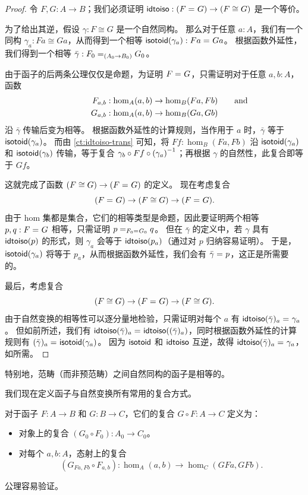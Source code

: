 \begin{proof}
  令 $F,G:A\to B$；我们必须证明 $\idtoiso:(\id{F}{G}) \to (F\cong G)$ 是一个等价。

  为了给出其逆，假设 $\gamma:F\cong G$ 是一个自然同构。
  那么对于任意 $a:A$，我们有一个同构 $\gamma_a:Fa \cong Ga$，从而得到一个相等 $\isotoid(\gamma_a):\id{Fa}{Ga}$。
  根据函数外延性，我们得到一个相等 $\bar{\gamma}:\id[(A_0\to B_0)]{F_0}{G_0}$。

  由于函子的后两条公理仅仅是命题，为证明 $\id{F}{G}$，只需证明对于任意 $a,b:A$，函数
  \begin{align*}
    F_{a,b}&:\hom_A(a,b) \to \hom_B(Fa,Fb)\mathrlap{\qquad\text{and}}\\
    G_{a,b}&:\hom_A(a,b) \to \hom_B(Ga,Gb)
  \end{align*}
  沿 $\bar\gamma$ 传输后变为相等。
  根据函数外延性的计算规则，当作用于 $a$ 时，$\bar\gamma$ 等于 $\isotoid(\gamma_a)$。
  而由 \cref{ct:idtoiso-trans} 可知，将 $Ff:\hom_B(Fa,Fb)$ 沿 $\isotoid(\gamma_a)$ 和 $\isotoid(\gamma_b)$ 传输，等于复合 $\gamma_b\circ Ff\circ \inv{(\gamma_a)}$；再根据 $\gamma$ 的自然性，此复合即等于 $Gf$。

  这就完成了函数 $(F\cong G) \to (\id F G)$ 的定义。
  现在考虑复合
  \[ (\id F G) \to (F\cong G) \to (\id F G). \]
  由于 hom 集都是集合，它们的相等类型是命题，因此要证明两个相等 $p,q:\id F G$ 相等，只需证明 $\id[\id{F_0}{G_0}]{p}{q}$。
  但在 $\bar\gamma$ 的定义中，若 $\gamma$ 具有 $\idtoiso(p)$ 的形式，则 $\gamma_a$ 会等于 $\idtoiso(p_a)$（通过对 $p$ 归纳容易证明）。
  于是，$\isotoid(\gamma_a)$ 将等于 $p_a$，从而根据函数外延性，我们会有 $\id{\bar\gamma}{p}$，这正是所需要的。

  最后，考虑复合
  \[(F\cong G)\to  (\id F G) \to (F\cong G). \]
  由于自然变换的相等性可以逐分量地检验，只需证明对每个 $a$ 有 $\id{\idtoiso(\bar\gamma)_a}{\gamma_a}$。
  但如前所述，我们有 $\id{\idtoiso(\bar\gamma)_a}{\idtoiso((\bar\gamma)_a)}$，同时根据函数外延性的计算规则有 $\id{(\bar\gamma)_a}{\isotoid(\gamma_a)}$。
  因为 $\isotoid$ 和 $\idtoiso$ 互逆，故得 $\id{\idtoiso(\bar\gamma)_a}{\gamma_a}$，如所需。
\end{proof}

特别地，范畴（而非预范畴）之间自然同构的函子是相等的。

\mentalpause

我们现在定义函子与自然变换所有常用的复合方式。

\begin{defn}\label{ct:functor-composition}
  对于函子 $F:A\to B$ 和 $G:B\to C$，它们的复合 $G\circ F:A\to C$ 定义为：
  \begin{itemize}
  \item 对象上的复合 $(G_0\circ F_0) : A_0 \to C_0$。
  \item 对每个 $a,b:A$，态射上的复合
    \[(G_{Fa,Fb}\circ F_{a,b}):\hom_A(a,b) \to \hom_C(GFa,GFb).\]
  \end{itemize}
  公理容易验证。
\end{defn}


